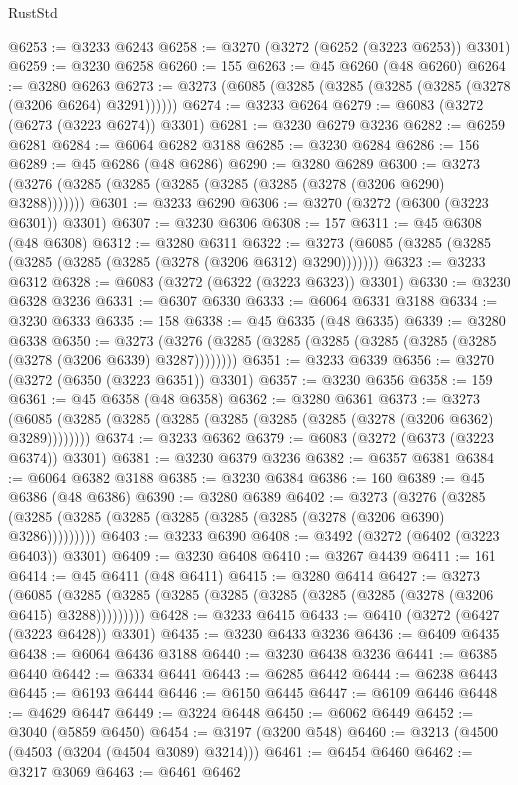 \begin{lexlean}{RustStd}
\begin{coremodule}
{\begin{coremodule}
{{{{{{{{{{{{{{{{{{{{{{{{{{{{{{{{{{{{{@6253 := @3233 @6243
@6258 := @3270 (@3272 (@6252 (@3223 @6253)) @3301)
@6259 := @3230 @6258
@6260 := 155
@6263 := @45 @6260 (@48 @6260)
@6264 := @3280 @6263
@6273 := @3273 (@6085 (@3285 (@3285 (@3285 (@3285 (@3278 (@3206 @6264) @3291))))))
@6274 := @3233 @6264
@6279 := @6083 (@3272 (@6273 (@3223 @6274)) @3301)
@6281 := @3230 @6279 @3236
@6282 := @6259 @6281
@6284 := @6064 @6282 @3188
@6285 := @3230 @6284
@6286 := 156
@6289 := @45 @6286 (@48 @6286)
@6290 := @3280 @6289
@6300 := @3273 (@3276 (@3285 (@3285 (@3285 (@3285 (@3285 (@3278 (@3206 @6290) @3288)))))))
@6301 := @3233 @6290
@6306 := @3270 (@3272 (@6300 (@3223 @6301)) @3301)
@6307 := @3230 @6306
@6308 := 157
@6311 := @45 @6308 (@48 @6308)
@6312 := @3280 @6311
@6322 := @3273 (@6085 (@3285 (@3285 (@3285 (@3285 (@3285 (@3278 (@3206 @6312) @3290)))))))
@6323 := @3233 @6312
@6328 := @6083 (@3272 (@6322 (@3223 @6323)) @3301)
@6330 := @3230 @6328 @3236
@6331 := @6307 @6330
@6333 := @6064 @6331 @3188
@6334 := @3230 @6333
@6335 := 158
@6338 := @45 @6335 (@48 @6335)
@6339 := @3280 @6338
@6350 := @3273 (@3276 (@3285 (@3285 (@3285 (@3285 (@3285 (@3285 (@3278 (@3206 @6339) @3287))))))))
@6351 := @3233 @6339
@6356 := @3270 (@3272 (@6350 (@3223 @6351)) @3301)
@6357 := @3230 @6356
@6358 := 159
@6361 := @45 @6358 (@48 @6358)
@6362 := @3280 @6361
@6373 := @3273 (@6085 (@3285 (@3285 (@3285 (@3285 (@3285 (@3285 (@3278 (@3206 @6362) @3289))))))))
@6374 := @3233 @6362
@6379 := @6083 (@3272 (@6373 (@3223 @6374)) @3301)
@6381 := @3230 @6379 @3236
@6382 := @6357 @6381
@6384 := @6064 @6382 @3188
@6385 := @3230 @6384
@6386 := 160
@6389 := @45 @6386 (@48 @6386)
@6390 := @3280 @6389
@6402 := @3273
    (@3276 (@3285 (@3285 (@3285 (@3285 (@3285 (@3285 (@3285 (@3278 (@3206 @6390) @3286)))))))))
@6403 := @3233 @6390
@6408 := @3492 (@3272 (@6402 (@3223 @6403)) @3301)
@6409 := @3230 @6408
@6410 := @3267 @4439
@6411 := 161
@6414 := @45 @6411 (@48 @6411)
@6415 := @3280 @6414
@6427 := @3273
    (@6085 (@3285 (@3285 (@3285 (@3285 (@3285 (@3285 (@3285 (@3278 (@3206 @6415) @3288)))))))))
@6428 := @3233 @6415
@6433 := @6410 (@3272 (@6427 (@3223 @6428)) @3301)
@6435 := @3230 @6433 @3236
@6436 := @6409 @6435
@6438 := @6064 @6436 @3188
@6440 := @3230 @6438 @3236
@6441 := @6385 @6440
@6442 := @6334 @6441
@6443 := @6285 @6442
@6444 := @6238 @6443
@6445 := @6193 @6444
@6446 := @6150 @6445
@6447 := @6109 @6446
@6448 := @4629 @6447
@6449 := @3224 @6448
@6450 := @6062 @6449
@6452 := @3040 (@5859 @6450)
@6454 := @3197 (@3200 @548)
@6460 := @3213 (@4500 (@4503 (@3204 (@4504 @3089) @3214)))
@6461 := @6454 @6460
@6462 := @3217 @3069
@6463 := @6461 @6462
}}}}}}}}}}}}}}}}}}}}}}}}}}}}}}}}}}}}}
\end{coremodule}}
\end{coremodule}
\end{lexlean}
